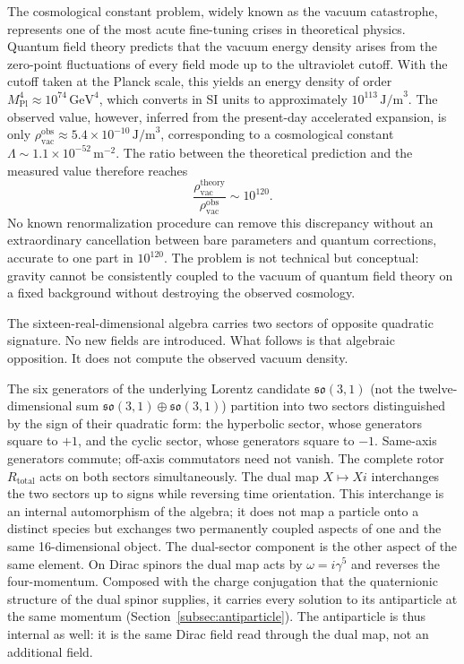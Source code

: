 \documentclass[a4paper]{article}
\begin{document}
The cosmological constant problem, widely known as the vacuum catastrophe, represents one of the most acute fine-tuning crises in theoretical physics. Quantum field theory predicts that the vacuum energy density arises from the zero-point fluctuations of every field mode up to the ultraviolet cutoff. With the cutoff taken at the Planck scale, this yields an energy density of order \(M_\text{Pl}^4 \approx 10^{74}\,\text{GeV}^4\), which converts in SI units to approximately \(10^{113}\,\text{J/m}^3\). The observed value, however, inferred from the present-day accelerated expansion, is only \(\rho_\text{vac}^\text{obs} \approx 5.4 \times 10^{-10}\,\text{J/m}^3\), corresponding to a cosmological constant \(\Lambda \sim 1.1 \times 10^{-52}\,\text{m}^{-2}\). The ratio between the theoretical prediction and the measured value therefore reaches
\[
\frac{\rho_\text{vac}^\text{theory}}{\rho_\text{vac}^\text{obs}} \sim 10^{120}.
\]
No known renormalization procedure can remove this discrepancy without an extraordinary cancellation between bare parameters and quantum corrections, accurate to one part in \(10^{120}\). The problem is not technical but conceptual: gravity cannot be consistently coupled to the vacuum of quantum field theory on a fixed background without destroying the observed cosmology.

The sixteen-real-dimensional algebra carries two sectors of opposite quadratic signature. No new fields are introduced. What follows is that algebraic opposition. It does not compute the observed vacuum density.

The six generators of the underlying Lorentz candidate \(\mathfrak{so}(3,1)\) (not the twelve-dimensional sum \(\mathfrak{so}(3,1)\oplus\mathfrak{so}(3,1)\)) partition into two sectors distinguished by the sign of their quadratic form: the hyperbolic sector, whose generators square to \(+1\), and the cyclic sector, whose generators square to \(-1\). Same-axis generators commute; off-axis commutators need not vanish. The complete rotor \(R_\text{total}\) acts on both sectors simultaneously. The dual map \(X \mapsto Xi\) interchanges the two sectors up to signs while reversing time orientation. This interchange is an internal automorphism of the algebra; it does not map a particle onto a distinct species but exchanges two permanently coupled aspects of one and the same 16-dimensional object. The dual-sector component is the other aspect of the same element. On Dirac spinors the dual map acts by $\omega=i\gamma^5$ and reverses the four-momentum. Composed with the charge conjugation that the quaternionic structure of the dual spinor supplies, it carries every solution to its antiparticle at the same momentum (Section~\ref{subsec:antiparticle}). The antiparticle is thus internal as well: it is the same Dirac field read through the dual map, not an additional field.
\end{document}
